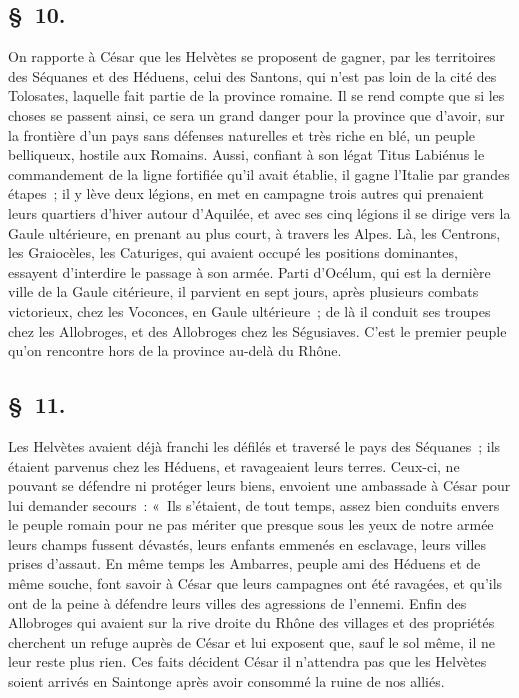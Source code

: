 \documentclass[french,twoside]{book} %
\begin{document}
\subsection[{§ 10.}]{ \textsc{§ 10.} }
\noindent On rapporte à César que les Helvètes se proposent de gagner, par les territoires des Séquanes et des Héduens, celui des Santons, qui n’est pas loin de la cité des Tolosates, laquelle fait partie de la province romaine. Il se rend compte que si les choses se passent ainsi, ce sera un grand danger pour la province que d’avoir, sur la frontière d’un pays sans défenses naturelles et très riche en blé, un peuple belliqueux, hostile aux Romains. Aussi, confiant à son légat Titus Labiénus le commandement de la ligne fortifiée qu’il avait établie, il gagne l’Italie par grandes étapes ; il y lève deux légions, en met en campagne trois autres qui prenaient leurs quartiers d’hiver autour d’Aquilée, et avec ses cinq légions il se dirige vers la Gaule ultérieure, en prenant au plus court, à travers les Alpes. Là, les Centrons, les Graiocèles, les Caturiges, qui avaient occupé les positions dominantes, essayent d’interdire le passage à son armée. Parti d’Océlum, qui est la dernière ville de la Gaule citérieure, il parvient en sept jours, après plusieurs combats victorieux, chez les Voconces, en Gaule ultérieure ; de là il conduit ses troupes chez les Allobroges, et des Allobroges chez les Ségusiaves. C'est le premier peuple qu’on rencontre hors de la province au-delà du Rhône.
\subsection[{§ 11.}]{ \textsc{§ 11.} }
\noindent Les Helvètes avaient déjà franchi les défilés et traversé le pays des Séquanes ; ils étaient parvenus chez les Héduens, et ravageaient leurs terres. Ceux-ci, ne pouvant se défendre ni protéger leurs biens, envoient une ambassade à César pour lui demander secours : « Ils s’étaient, de tout temps, assez bien conduits envers le peuple romain pour ne pas mériter que presque sous les yeux de notre armée leurs champs fussent dévastés, leurs enfants emmenés en esclavage, leurs villes prises d’assaut. En même temps les Ambarres, peuple ami des Héduens et de même souche, font savoir à César que leurs campagnes ont été ravagées, et qu’ils ont de la peine à défendre leurs villes des agressions de l’ennemi. Enfin des Allobroges qui avaient sur la rive droite du Rhône des villages et des propriétés cherchent un refuge auprès de César et lui exposent que, sauf le sol même, il ne leur reste plus rien. Ces faits décident César il n’attendra pas que les Helvètes soient arrivés en Saintonge après avoir consommé la ruine de nos alliés.
\end{document}
